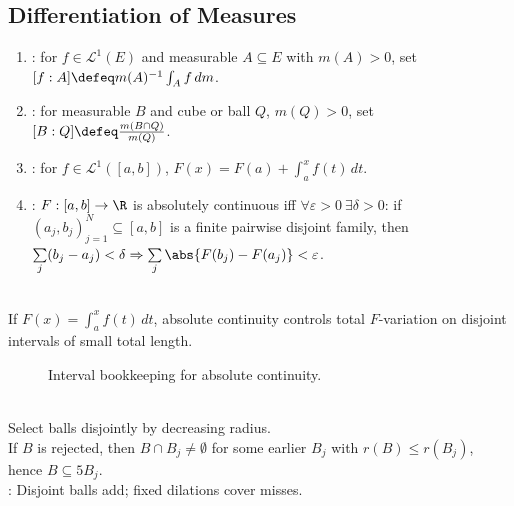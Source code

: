 \subsection{Differentiation of Measures}

\begin{definition} \label{def:lebesgue-averages-and-absolute-continuity} 
\begin{enumerate}[label=(\roman*)]
\setlength{\itemsep}{0pt}
\item {}: for $f\in\mathscr{L}^1(E)$ and measurable $A\subseteq E$ with $m(A)>0$, set $[f:A]\defeq m(A)^{-1}\int_Af\,dm$.
\item {}: for measurable $B$ and cube or ball $Q$, $m(Q)>0$, set $[B:Q]\defeq\frac{m(B\cap Q)}{m(Q)}$.
\item {}: for $f\in\mathscr{L}^1([a,b])$, $F(x)=F(a)+\int_a^xf(t)\,dt$.
\item {}: $F:[a,b]\to\R$ is absolutely continuous iff $\forall\varepsilon>0\ \exists\delta>0$: if $(a_j,b_j)_{j=1}^N\subseteq[a,b]$ is a finite pairwise disjoint family, then $\sum\limits_j(b_j-a_j)<\delta\Rightarrow\sum\limits_j\abs{F(b_j)-F(a_j)}<\varepsilon$.
\end{enumerate}
\end{definition}

\begin{perspective} \label{per:absolute-continuity-interval-bookkeeping} \\
If $F(x)=\int_a^x f(t)\,dt$, absolute continuity controls total $F$-variation on disjoint intervals of small total length.
\end{perspective}

\begin{figure}[H]
  \centering
  
  \caption{Interval bookkeeping for absolute continuity.}
  \label{fig:absolute-continuity-interval-decomposition}
\end{figure}

\begin{perspective} \label{per:vitali-covering-fivefold-control} \\
Select balls disjointly by decreasing radius.\\
If $B$ is rejected, then $B\cap B_j\neq\emptyset$ for some earlier $B_j$ with $r(B)\leq r(B_j)$, hence $B\subseteq5B_j$.\\
: Disjoint balls add; fixed dilations cover misses.
\end{perspective}

